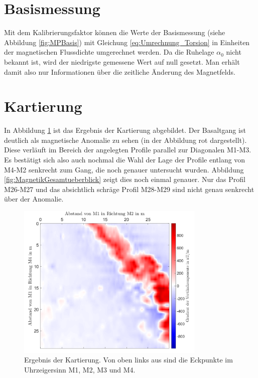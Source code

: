 \section{Basismessung}

Mit dem Kalibrierungsfaktor können die Werte der Basismessung (siehe Abbildung \ref{fig:MPBasis}) mit Gleichung \eqref{eq:Umrechnung_Torsion} in Einheiten der magnetischen Flussdichte umgerechnet werden. Da die Ruhelage $\alpha_0$ nicht bekannt ist, wird der niedrigste gemessene Wert auf null gesetzt. Man erhält damit also nur Informationen über die zeitliche Änderung des Magnetfelds. 

\section{Kartierung}

In Abbildung \ref{fig:Kartierung} ist das Ergebnis der Kartierung abgebildet. Der Basaltgang ist deutlich als magnetische Anomalie zu sehen (in der Abbildung rot dargestellt). Diese verläuft im Bereich der angelegten Profile parallel zur Diagonalen M1-M3. Es bestätigt sich also auch nochmal die Wahl der Lage der Profile entlang von M4-M2 senkrecht zum Gang, die noch genauer untersucht wurden. Abbildung \ref{fig:MagnetikGesamtueberblick} zeigt dies noch einmal genauer. Nur das Profil M26-M27 und das absichtlich schräge Profil M28-M29 sind nicht genau senkrecht über der Anomalie.

\begin{figure}[!ht]
 \centering
 \includegraphics[width=0.8\textwidth]{fig/kartierung_verschwommen.png}
 \caption[Ergebnis der Kartierung]{Ergebnis der Kartierung. Von oben links aus sind die Eckpunkte im Uhrzeigersinn M1, M2, M3 und M4.}
 \label{fig:Kartierung}
\end{figure}

